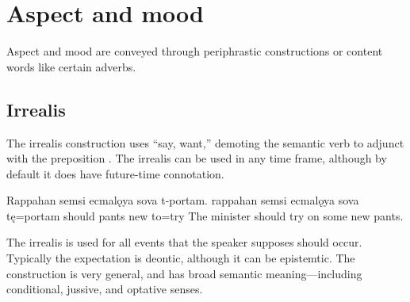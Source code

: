 \section{Aspect and mood}
Aspect and mood are conveyed through periphrastic constructions or content words like certain adverbs.

\subsection{Irrealis}
The irrealis construction uses  “say, want,” demoting the semantic verb to adjunct with the preposition . The irrealis can be used in any time frame, although by default it does have future-time connotation.

\begin{example}
	\script Rappahan semsi ecmalǫya sova t-portam.
	\bits rappahan semsi ecmalǫya sova tę=portam
	 should pants new to=try
	\tr The minister should try on some new pants. 
\end{example}

The irrealis is used for all events that the speaker supposes should occur. Typically the expectation is deontic, although it can be epistemtic. The construction is very general, and has broad semantic meaning---including conditional, jussive, and optative senses.